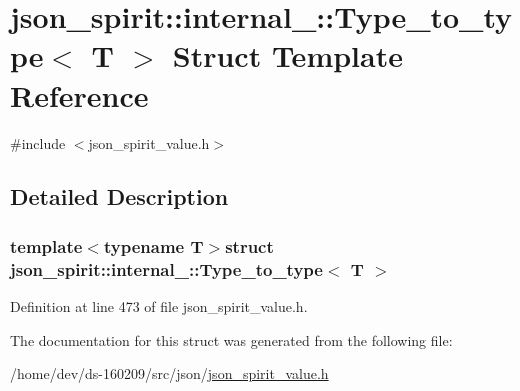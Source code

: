 \hypertarget{structjson__spirit_1_1internal___1_1_type__to__type}{}\section{json\+\_\+spirit\+:\+:internal\+\_\+\+:\+:Type\+\_\+to\+\_\+type$<$ T $>$ Struct Template Reference}
\label{structjson__spirit_1_1internal___1_1_type__to__type}


{\ttfamily \#include $<$json\+\_\+spirit\+\_\+value.\+h$>$}



\subsection{Detailed Description}
\subsubsection*{template$<$typename T$>$struct json\+\_\+spirit\+::internal\+\_\+\+::\+Type\+\_\+to\+\_\+type$<$ T $>$}



Definition at line 473 of file json\+\_\+spirit\+\_\+value.\+h.



The documentation for this struct was generated from the following file\+:\begin{DoxyCompactItemize}
\item 
/home/dev/ds-\/160209/src/json/\hyperlink{json__spirit__value_8h}{json\+\_\+spirit\+\_\+value.\+h}\end{DoxyCompactItemize}
